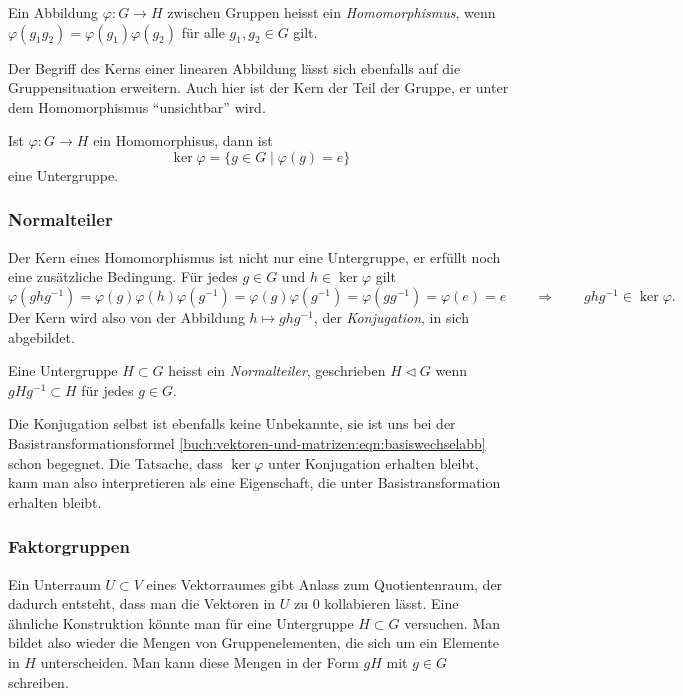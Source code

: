 \begin{definition}
\label{buch:gruppen:def:homomorphismus}
Ein Abbildung $\varphi\colon G\to H$ zwischen Gruppen heisst ein
{\em Homomorphismus}, wenn 
$\varphi(g_1g_2)=\varphi(g_1)\varphi(g_2)$ für alle $g_1,g_2\in G$ gilt.
%
\end{definition}

Der Begriff des Kerns einer linearen Abbildung lässt sich ebenfalls auf
die Gruppensituation erweitern.
Auch hier ist der Kern der Teil der Gruppe, er unter dem 
Homomorphismus ``unsichtbar'' wird.

\begin{definition}
Ist $\varphi\colon G\to H$ ein Homomorphisus, dann ist
\[
\ker\varphi
=
\{g\in G\;|\; \varphi(g)=e\}
\]
eine Untergruppe.
%
\end{definition}

\subsubsection{Normalteiler}
Der Kern eines Homomorphismus ist nicht nur eine Untergruppe, er erfüllt
noch eine zusätzliche Bedingung. 
Für jedes $g\in G$ und $h\in\ker\varphi$ gilt 
\[
\varphi(ghg^{-1})
=
\varphi(g)\varphi(h)\varphi(g^{-1})
=
\varphi(g)\varphi(g^{-1})
=
\varphi(gg^{-1})
=
\varphi(e)
=
e
\qquad\Rightarrow\qquad
ghg^{-1}\in\ker\varphi.
\]
Der Kern wird also von der Abbildung $h\mapsto ghg^{-1}$,
der {\em Konjugation}, in sich abgebildet.

\begin{definition}
Eine Untergruppe $H \subset G$ heisst ein {\em Normalteiler},
geschrieben $H \triangleleft G$
wenn $gHg^{-1}\subset H$ für jedes $g\in G$.
%
\end{definition}

Die Konjugation selbst ist ebenfalls keine Unbekannte, sie ist uns
bei der Basistransformationsformel
\eqref{buch:vektoren-und-matrizen:eqn:basiswechselabb}
schon begegnet.
Die Tatsache, dass $\ker\varphi$ unter Konjugation erhalten bleibt,
kann man also interpretieren als eine Eigenschaft, die unter
Basistransformation erhalten bleibt.

\subsubsection{Faktorgruppen}
Ein Unterraum $U\subset V$ eines Vektorraumes gibt Anlass zum
Quotientenraum, der dadurch entsteht, dass man die Vektoren in $U$
zu $0$ kollabieren lässt.
Eine ähnliche Konstruktion könnte man für eine Untergruppe $H \subset G$
versuchen.
Man bildet also wieder die Mengen von Gruppenelementen, die sich um
ein Elemente in $H$ unterscheiden.
Man kann diese Mengen in der Form $gH$ mit $g\in G$ schreiben.

